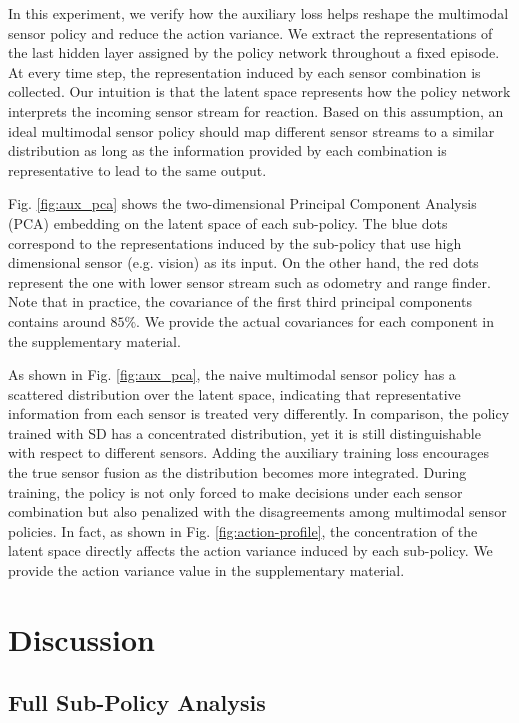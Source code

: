 \documentclass[../thesis.tex]{subfiles}
\begin{document}
In this experiment, we verify how the auxiliary loss helps reshape the multimodal sensor policy and reduce the action variance.
We extract the representations of the last hidden layer assigned by the policy network throughout a fixed episode. At every time step, the representation induced by each sensor combination is collected.
Our intuition is that the latent space represents how the policy network interprets the incoming sensor stream for reaction. Based on this assumption, an ideal multimodal sensor policy should map different sensor streams to a similar distribution as long as the information provided by each combination is representative to lead to the same output.
 
Fig. \ref{fig:aux_pca} shows the two-dimensional Principal Component Analysis (PCA) embedding on the latent space of each sub-policy. The blue dots correspond to the representations induced by the sub-policy that use high dimensional sensor (e.g. vision) as its input. On the other hand, the red dots represent the one with lower sensor stream such as odometry and range finder. Note that in practice, the covariance of the first third principal components contains around $85\%$. We provide the actual covariances for each component in the supplementary material.
 
As shown in Fig. \ref{fig:aux_pca}, the naive multimodal sensor policy has a scattered distribution over the latent space, indicating that representative information from each sensor is treated very differently. In comparison, the policy trained with SD has a concentrated distribution, yet it is still distinguishable with respect to different sensors. Adding the auxiliary training loss encourages the true sensor fusion as the distribution becomes more integrated. During training, the policy is not only forced to make decisions under each sensor combination but also penalized with the disagreements among multimodal sensor policies. In fact, as shown in Fig. \ref{fig:action-profile}, the concentration of the latent space directly affects the action variance induced by each sub-policy. We provide the action variance value in the supplementary material.
 
 
\section{Discussion} \label{sec:mdrl-discussion}
 
 
\subsection{Full Sub-Policy Analysis}
\label{SD-full-config}
 
\end{document}
